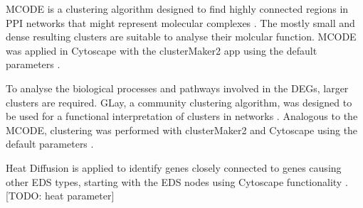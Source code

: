 \begin{description}[leftmargin=5pt]
	\begin{description}[leftmargin=5pt]
		\item[MCODE]MCODE is a clustering algorithm designed to find highly connected regions in PPI networks that might represent molecular complexes \cite{mcode}. The mostly small and dense resulting clusters are suitable to analyse their molcular function. MCODE was applied in Cytoscape with the clusterMaker2 app using the default parameters \cite{clusterMaker2}.
		
		\item[Community Clustering]To analyse the biological processes and pathways involved in the DEGs, larger clusters are required. GLay, a community clustering algorithm, was designed to be used for a functional interpretation of clusters in networks \cite{GLay}. Analogous to the MCODE, clustering was performed with clusterMaker2 and Cytoscape using the default parameters \cite{Cytoscape, clusterMaker2}.
		
		Heat Diffusion is applied to identify genes closely connected to genes causing other EDS types, starting with the EDS nodes using Cytoscape functionality \cite{heatDiffusion}. [TODO: heat parameter]
	\end{description}
\end{description}


